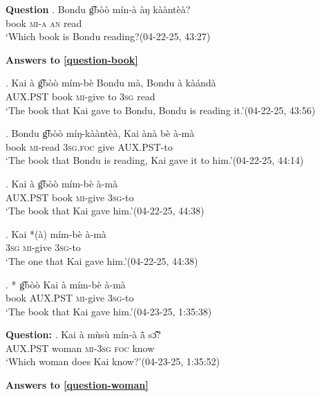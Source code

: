 \documentclass{assets/fieldnotes}
\begin{document}

\textbf{Question}
\exg. \label{question-book}
    Bondu g͡bòò mín-à àŋ kààntèà?\\
    {} {} book \textsc{mi-a} \textsc{an} read\\
    `Which book is Bondu reading?\hfill{(04-22-25, 43:27)}

\textbf{Answers to \ref{question-book}}
    
\exg. Kai à g͡bòò mím-bè Bondu mà, Bondu à kàándà\\
{} \textsc{AUX.PST} book \textsc{mi}-give {} to {} \textsc{3sg} read\\
`The book that Kai gave to Bondu, Bondu is reading it.’\hfill{(04-22-25, 43:56)}
    
\exg. Bondu g͡bòò míŋ-kààntèà, Kai ànà bè à-mà\\
{} book \textsc{mi}-read {} \textsc{3sg.foc} give \textsc{AUX.PST}-to\\
`The book that Bondu is reading, Kai gave it to him.’\hfill{(04-22-25, 44:14)}

\exg. Kai à g͡bòò mím-bè à-mà\\
{} \textsc{AUX.PST} book \textsc{mi}-give \textsc{3sg}-to\\
`The book that Kai gave him.’\hfill{(04-22-25, 44:38)}

\exg. Kai *(à) mím-bè à-mà\\
{} \textsc{3sg} \textsc{mi}-give \textsc{3sg}-to\\
`The one that Kai gave him.’\hfill{(04-22-25, 44:38)}\label{answer_book}

\exg. * g͡bòò Kai à mím-bè à-mà\\
book {} \textsc{AUX.PST} \textsc{mi}-give \textsc{3sg}-to\\
\trans `The book that Kai gave him.’\hfill{(04-23-25, 1:35:38)}

\noindent{\rule{\textwidth}{1pt}}

\textbf{Question:}
\exg.
Kai à mùsù mín-à ã̀ sɔ̃̂?\\
{} \textsc{AUX.PST} woman \textsc{mi-3sg} \textsc{foc} know\\
`Which woman does Kai know?’\hfill{(04-23-25, 1:35:52)} \label{question-woman}

\textbf{Answers to \ref{question-woman}}
\end{document}
